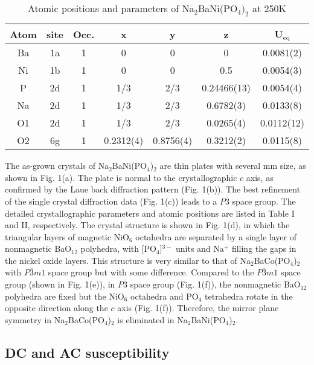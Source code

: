 \documentclass[aps,twocolumn,superscriptaddress,showpacs]{revtex4-1}
\begin{document}
\begin{table}[h]
	\caption{Atomic positions and parameters of Na$_{2}$BaNi(PO$_4)_2$ at 250K} %
	\centering %
	\begin{tabular}{c c c c c c c} %
		\hline\hline %
		Atom & site & Occ. & x & y & z & U$_\text{eq}$ \\ [0.5ex] %
		\hline %
		Ba & 1a & 1 & 0 & 0 & 0 & 0.0081(2) \\ %
		Ni & 1b & 1 & 0 & 0 & 0.5 & 0.0054(3)\\
		P & 2d & 1 & 1/3 & 2/3 & 0.24466(13) & 0.0054(4) \\
		Na & 2d & 1 & 1/3 & 2/3 & 0.6782(3) & 0.0133(8)\\
		O1 & 2d & 1 & 1/3 & 2/3 & 0.0265(4) & 0.0112(12)\\
		O2 & 6g & 1 & 0.2312(4) & 0.8756(4) & 0.3212(2) & 0.0115(8)\\
		\hline %
	\end{tabular}
	\label{table:nuclear2} %
\end{table}

The as-grown crystals of Na$_2$BaNi(PO$_4$)$_2$ are thin plates with several mm size, as shown in Fig. 1(a). The plate is normal to the crystallographic $c$ axis, as confirmed by the Laue back diffraction pattern (Fig. 1(b)). The best refinement of the single crystal diffraction data (Fig. 1(c)) leads to a $P\overline{3}$ space group. The detailed crystallographic parameters and atomic positions are listed in Table I and II, respectively. The crystal structure is shown in Fig. 1(d), in which the triangular layers of magnetic NiO$_6$ octahedra are separated by a single layer of nonmagnetic BaO$_{12}$ polyhedra, with [PO$_4$]$^{3-}$ units and Na$^+$ filling the gaps in the nickel oxide layers. This structure is very similar to that of Na$_2$BaCo(PO$_4$)$_2$ with $P\overline{3}m1$ space group but with some difference. Compared to the $P\overline{3}m1$ space group (shown in Fig. 1(e)), in $P\overline{3}$ space group (Fig. 1(f)), the nonmagnetic BaO$_{12}$ polyhedra are fixed but the NiO$_6$ octahedra and PO$_4$ tetrahedra rotate in the opposite direction along the $c$ axis (Fig. 1(f)). Therefore, the mirror plane symmetry in Na$_2$BaCo(PO$_4$)$_2$ is eliminated in Na$_2$BaNi(PO$_4$)$_2$.


\subsection{DC and AC susceptibility}
\end{document}
